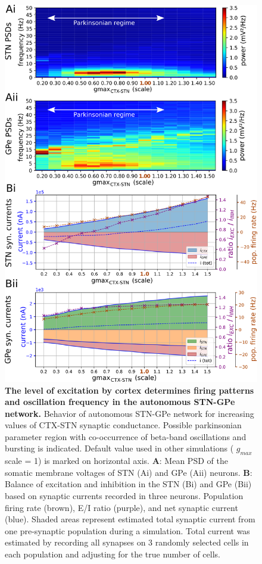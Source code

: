 \begin{figure}
\centering
\includegraphics[height=\dimexpr \textheight - 12\baselineskip\relax]{ch_detailed_model/figs_split/fig_endogenous_sweep-gmax-ctx-stn_A-psd-currents.png}
%
\caption{\textbf{The level of excitation by cortex determines firing patterns and oscillation frequency in the autonomous STN-GPe network.}
Behavior of autonomous STN-GPe network for increasing values of CTX-STN synaptic conductance. Possible parkinsonian parameter region with co-occurrence of beta-band oscillations and bursting is indicated. Default value used in other simulations ({\color{brown} $g_{max}$ scale = 1}) is marked on horizontal axis.
\textbf{A}: Mean PSD of the somatic membrane voltages of STN (Ai) and GPe (Aii) neurons.
\textbf{B}: Balance of excitation and inhibition in the STN (Bi) and GPe (Bii) based on synaptic currents recorded in three neurons. Population firing rate (brown), E/I ratio (purple), and net synaptic current (blue). Shaded areas represent estimated total synaptic current from one pre-synaptic population during a simulation. Total current was estimated by recording all synapses on 3 randomly selected cells in each population and adjusting for the true number of cells.}
\label{fig:endogenous_sweep-gmax-ctx-stn_A-psd-currents}
\end{figure}

